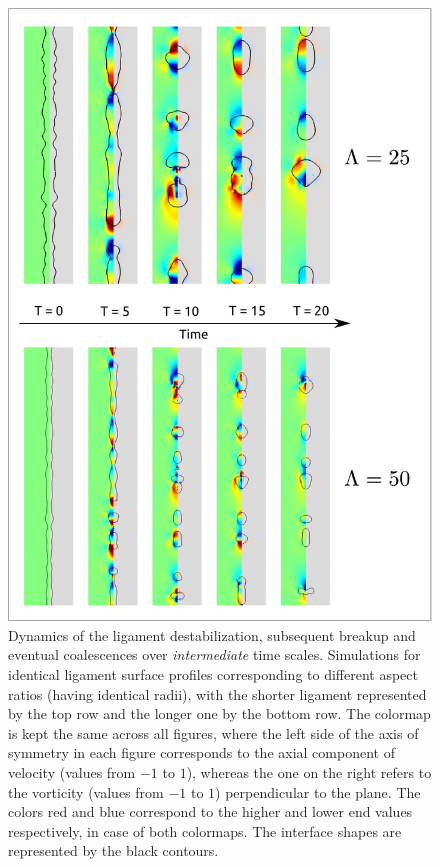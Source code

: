 \begin{figure}
\centering
\includegraphics{plots/ligament_breakup/aspect_compare.pdf}
	\caption{Dynamics of the ligament destabilization, subsequent breakup 
	and eventual coalescences over \textit{intermediate} time scales.
	Simulations for identical ligament surface profiles
	corresponding to different aspect ratios (having identical radii), 
	with the shorter ligament represented by the top row and the longer one by the bottom row. 
	The colormap is kept the same across all figures, where the left 
	side of the axis of symmetry in each figure corresponds to the axial component of 
	velocity (values from $-1$ to $1$), whereas the one on the right refers to 
	the vorticity (values from $-1$ to $1$) perpendicular to the plane. 
	The colors red and blue correspond to the higher and lower 
	end values respectively, in case of both colormaps. 
	The interface shapes are represented by the black contours.
	}
\label{asp_comp}
\end{figure}

